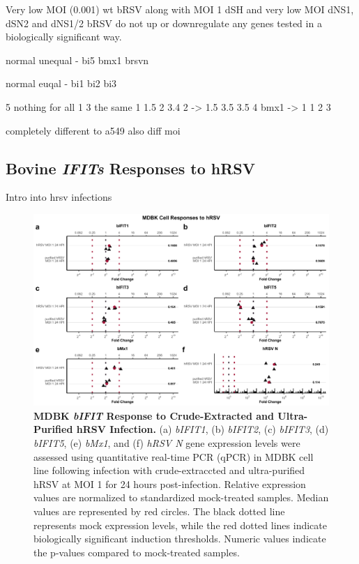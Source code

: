 Very low MOI (0.001) wt bRSV along with MOI 1 dSH and very low MOI dNS1, dSN2 and dNS1/2 bRSV do not up or downregulate any genes tested in a biologically significant way.

normal unequal - bi5 bmx1 brsvn

normal euqal - bi1 bi2 bi3 

5 nothing for all
1 3 the same    1 1.5 2 3.4
2 -> 1.5 3.5 3.5 4
bmx1 -> 1 1 2 3

completely different to a549
    also diff moi



\subsection{Bovine \textit{IFITs} Responses to hRSV} \label{subsec:Bovine IFITs Responses to hRSV}

Intro into hrsv infections


\begin{figure}
    \centering
    \includegraphics[width=1\linewidth]{07. Chapter 2/Figs/02. Induction/07. mdbk_hrsv.pdf}
    \caption[MDBK \textit{bIFIT} Response to Crude-Extracted and Ultra-Purified hRSV Infection.]{\textbf{MDBK \textit{bIFIT} Response to Crude-Extracted and Ultra-Purified hRSV Infection.} (a) \textit{bIFIT1}, (b) \textit{bIFIT2}, (c) \textit{bIFIT3}, (d) \textit{bIFIT5}, (e) \textit{bMx1}, and (f) \textit{hRSV N} gene expression levels were assessed using quantitative real-time PCR (qPCR) in MDBK cell line following infection with crude-extraccted and ultra-purified hRSV at MOI 1 for 24 hours post-infection. Relative expression values are normalized to standardized mock-treated samples. Median values are represented by red circles. The black dotted line represents mock expression levels, while the red dotted lines indicate biologically significant induction thresholds. Numeric values indicate the p-values compared to mock-treated samples.}
    \label{fig:bIFIT responses to hRSV infection in MDBK}
\end{figure}

